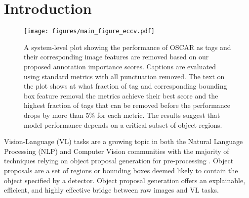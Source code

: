 \documentclass[10pt,twocolumn,letterpaper]{article}
\begin{document}
\section{Introduction}
\begin{figure}[t!]
\centering
\def\svgwidth{\columnwidth}
\texttt{[image: figures/main\_figure\_eccv.pdf]}
\caption{A system-level plot showing the performance of OSCAR \cite{oscar2020} as tags and their corresponding image features are removed based on our proposed annotation importance scores. Captions are evaluated using standard metrics \cite{cider2015,meteor2005,spice2016,smurf2021} with all punctuation removed. The text on the plot shows at what fraction of tag and corresponding bounding box feature removal the metrics achieve their best score and the highest fraction of tags that can be removed before the performance drops by more than 5\% for each metric. The results suggest that model performance depends on a critical subset of object regions.}
\label{main_figure}
\end{figure}
\par
Vision-Language (VL) tasks are a growing topic in both the Natural Language Processing (NLP) and Computer Vision communities with the majority of techniques relying on object proposal generation for pre-processing \cite{topbottom2018,vinvl2021}. Object proposals are a set of regions or bounding boxes deemed likely to contain the object specified by a detector. Object proposal generation offers an explainable, efficient, and highly effective bridge between raw images and VL tasks. 
\par
\end{document}
